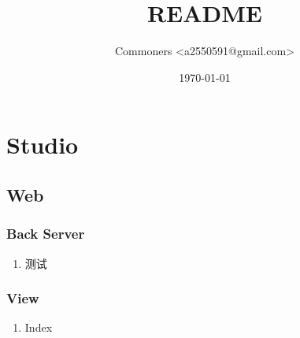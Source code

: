 \documentclass[11pt]{article}
\author{Commoners <a2550591@gmail.com>}
\date{\today}
\title{README}
\begin{document}
\maketitle


\section{Studio}
\label{sec-1}
\subsection{Web}
\label{sec-1-1}
\subsubsection{Back Server}
\label{sec-1-1-1}
\begin{enumerate}
\item 测试
\label{sec-1-1-1-1}
\end{enumerate}
\subsubsection{View}
\label{sec-1-1-2}
\begin{enumerate}
\item Index
\label{sec-1-1-2-1}
\end{enumerate}
\end{document}
